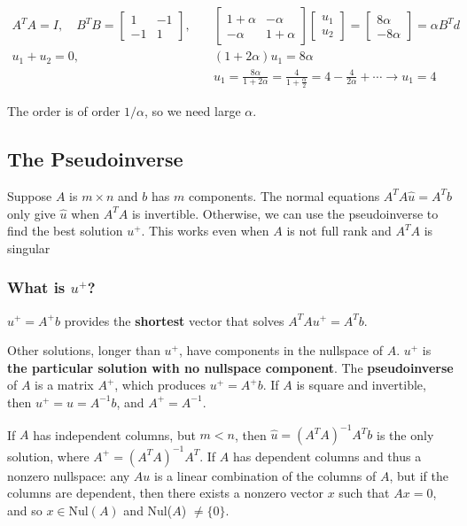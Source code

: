\documentclass[]{article}
\begin{document}
\begin{align*}
A^T A = I, \quad B^T B = \begin{bmatrix}
1 & -1 \\ -1 & 1
\end{bmatrix}, \quad &\begin{bmatrix}
1+\alpha & -\alpha \\ -\alpha & 1+\alpha
\end{bmatrix}\begin{bmatrix}
u_1 \\ u_2 
\end{bmatrix} = \begin{bmatrix}
8\alpha \\ -8\alpha
\end{bmatrix} = \alpha B^T d \\
u_1 + u_2 = 0, \quad &(1 + 2\alpha)u_1 = 8\alpha \\
&u_1 = \frac{8\alpha}{1+2\alpha} = \frac{4}{1 + \frac{\alpha}{2}} = 4 - \frac{4}{2\alpha} + \dotsm \rightarrow u_1 = 4
\end{align*}

The order is of order $1/\alpha$, so we need large $\alpha$.

\subsection{The Pseudoinverse}
Suppose $A$ is $m \times n$ and $b$ has $m$ components. The normal equations $A^{T}A\hat{u} = A^{T}b$ only give $\hat{u}$ when $A^{T}A$ is invertible. Otherwise, we can use the pseudoinverse to find the best solution $u^{+}$. This works even when $A$ is not full rank and $A^{T}A$ is singular

\subsubsection{What is $u^{+}$?}
$u^{+} = A^{+}b$ provides the \textbf{shortest} vector that solves $A^{T}Au^{+} = A^{T}b$. 

Other solutions, longer than $u^{+}$, have components in the nullspace of $A$. $u^{+}$ is \textbf{the particular solution with no nullspace component}. The \textbf{pseudoinverse} of $A$ is a matrix $A^{+}$, which produces $u^{+} = A^{+}b$. If $A$ is square and invertible, then $u^{+} = u = A^{-1}b$, and $A^{+} = A^{-1}$. 

If $A$ has independent columns, but $m < n$, then $\hat{u} = (A^{T}A)^{-1}A^{T}b$ is the only solution, where $A^{+} = (A^{T}A)^{-1}A^{T}$. If $A$ has dependent columns and thus a nonzero nullspace: any $Au$ is a linear combination of the columns of $A$, but if the columns are dependent, then there exists a nonzero vector $x$ such that $Ax = 0$, and so $x \in \textrm{Nul}(A)$ and Nul($A$) $\neq \{0\}$.
\end{document}
